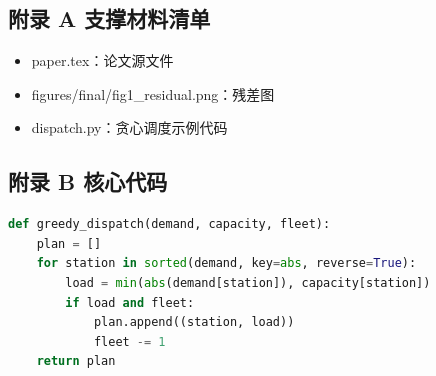 \documentclass[12pt,a4paper]{article}
\begin{document}
\subsection*{附录 A 支撑材料清单}

\begin{itemize}
\item paper.tex：论文源文件
\item figures/final/fig1\_residual.png：残差图
\item dispatch.py：贪心调度示例代码
\end{itemize}

\subsection*{附录 B 核心代码}

\begin{lstlisting}[language=Python]
def greedy_dispatch(demand, capacity, fleet):
    plan = []
    for station in sorted(demand, key=abs, reverse=True):
        load = min(abs(demand[station]), capacity[station])
        if load and fleet:
            plan.append((station, load))
            fleet -= 1
    return plan
\end{lstlisting}
\end{document}
